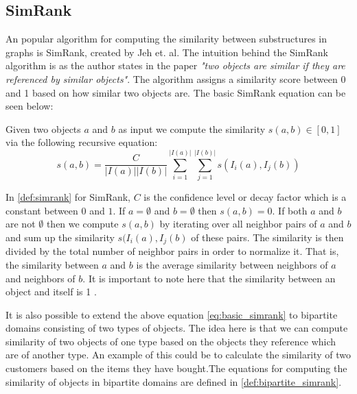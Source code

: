 \subsection{SimRank}
An popular algorithm for computing the similarity between substructures in graphs is SimRank, created by Jeh et. al\cite{10.1145/775047.775126}. The intuition behind the SimRank algorithm is as the author states in the paper \emph{"two objects are similar if they are referenced by similar objects"}\cite{10.1145/775047.775126}. The algorithm assigns a similarity score between 0 and 1 based on how similar two objects are. The basic SimRank equation can be seen below:
\begin{definition}[SimRank]\label{def:simrank} Given two objects $a$ and $b$ as input we compute the similarity $s(a,b) \in [0,1]$ via the following recursive equation:
	\begin{equation}\label{eq:basic_simrank}
	s(a,b)= \frac{C}{|I(a)||I(b)|}\sum^{|I(a)|}_{i=1}\sum^{|I(b)|}_{j=1}s(I_i(a),I_j(b))
	\end{equation}
\end{definition}
In \autoref{def:simrank} for SimRank, $C$ is the confidence level or decay factor which is a constant between $0$ and $1$. If $a=\emptyset$ and $b= \emptyset$ then $s(a,b) = 0$. If both $a$ and $b$ are not $\emptyset$ then we compute $s(a,b)$ by iterating over all neighbor  pairs of $a$ and $b$ and sum up the similarity $s(I_i(a),I_j(b)$ of these pairs. The similarity is then divided by the total number of neighbor pairs in order to normalize it. That is, the similarity between $a$ and $b$ is the average similarity between neighbors of $a$ and neighbors of $b$. It is important to note here that the similarity between an object and itself is 1 \cite{10.1145/775047.775126}.

It is also possible to extend the above equation \ref{eq:basic_simrank} to bipartite domains consisting of two types of objects. The idea here is that we can compute similarity of two objects of one type based on the objects they reference which are of another type. An example of this could be to calculate the similarity of two customers based on the items they have bought\cite{10.1145/775047.775126}.The equations for computing the similarity of objects in bipartite domains are defined in \autoref{def:bipartite_simrank}.

